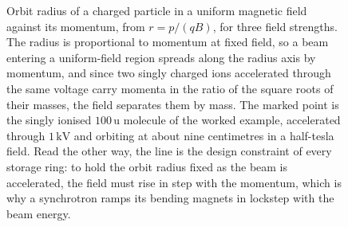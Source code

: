 \begin{figure}[htbp]
\centering
{}
\caption[Cyclotron orbit radius against momentum]{Orbit radius of a
charged particle in a uniform magnetic field against its momentum, from
$r = p/(qB)$, for three field strengths. The radius is proportional to
momentum at fixed field, so a beam entering a uniform-field region spreads
along the radius axis by momentum, and since two singly charged ions
accelerated through the same voltage carry momenta in the ratio of the
square roots of their masses, the field separates them by mass. The marked
point is the singly ionised $100\,\text{u}$ molecule of the worked example,
accelerated through $1\,\si{\kilo\volt}$ and orbiting at about nine
centimetres in a half-tesla field. Read the other way, the line is the
design constraint of every storage ring: to hold the orbit radius fixed as
the beam is accelerated, the field must rise in step with the momentum,
which is why a synchrotron ramps its bending magnets in lockstep with the
beam energy.}
\label{fig:vol04ch08:cyclotron-orbit}
\end{figure}
